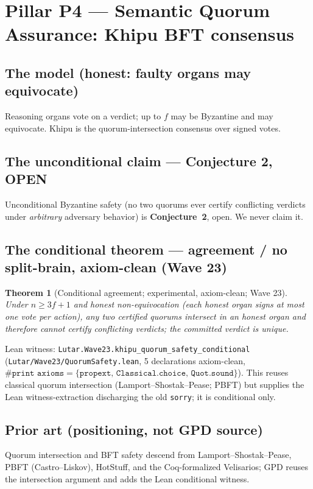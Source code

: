 \documentclass[11pt,letterpaper]{article}
\newtheorem{theorem}{Theorem}[section]
\theoremstyle{definition}
\newcommand{\Ucoreaxioms}{\{\texttt{propext},\,\texttt{Classical.choice},\,\texttt{Quot.sound}\}}
\begin{document}
\section{Pillar P4 --- Semantic Quorum Assurance: Khipu BFT consensus}\label{sec:p4}

\subsection{The model (honest: faulty organs may equivocate)}
Reasoning organs vote on a verdict; up to $f$ may be Byzantine and may
equivocate. Khipu is the quorum-intersection consensus over signed votes.

\subsection{The unconditional claim --- Conjecture 2, OPEN}
Unconditional Byzantine safety (no two quorums ever certify conflicting verdicts
under \emph{arbitrary} adversary behavior) is \textbf{Conjecture~2}, open. We
never claim it.

\subsection{The conditional theorem --- agreement / no split-brain, axiom-clean (Wave 23)}
\begin{theorem}[Conditional agreement; experimental, axiom-clean; Wave 23]\label{thm:khipu}
Under $n\ge 3f+1$ and \emph{honest non-equivocation} (each honest organ signs at
most one vote per action), any two certified quorums intersect in an honest organ
and therefore cannot certify conflicting verdicts; the committed verdict is
unique.
\end{theorem}
\noindent Lean witness: \texttt{Lutar.Wave23.khipu\_quorum\_safety\_conditional}
(\texttt{Lutar/Wave23/QuorumSafety.lean}, 5 declarations axiom-clean,
$\texttt{\#print axioms} = \Ucoreaxioms$). This reuses classical quorum
intersection (Lamport--Shostak--Pease; PBFT) but supplies the Lean
witness-extraction discharging the old \texttt{sorry}; it is conditional only.

\subsection{Prior art (positioning, not GPD source)}
Quorum intersection and BFT safety descend from Lamport--Shostak--Pease, PBFT
(Castro--Liskov), HotStuff, and the Coq-formalized Velisarios; GPD reuses the
intersection argument and adds the Lean conditional witness.
\end{document}
